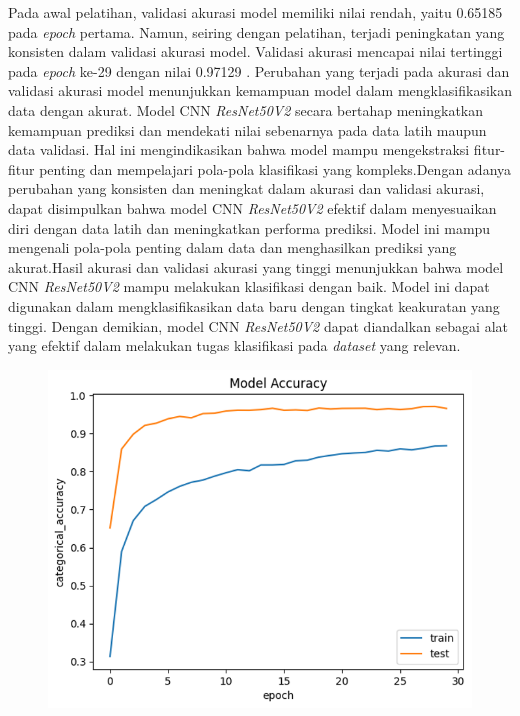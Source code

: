 Pada awal pelatihan, validasi akurasi model memiliki nilai rendah, yaitu 0.65185 pada \textit{epoch} pertama. Namun, seiring dengan pelatihan, terjadi peningkatan yang konsisten dalam validasi akurasi model. Validasi akurasi mencapai nilai tertinggi pada \textit{epoch} ke-29 dengan nilai 0.97129 . Perubahan yang terjadi pada akurasi dan validasi akurasi model menunjukkan kemampuan model dalam mengklasifikasikan data dengan akurat. Model CNN \textit{ResNet50V2} secara bertahap meningkatkan kemampuan prediksi dan mendekati nilai sebenarnya pada data latih maupun data validasi. Hal ini mengindikasikan bahwa model mampu mengekstraksi fitur-fitur penting dan mempelajari pola-pola klasifikasi yang kompleks.Dengan adanya perubahan yang konsisten dan meningkat dalam akurasi dan validasi akurasi, dapat disimpulkan bahwa model CNN \textit{ResNet50V2} efektif dalam menyesuaikan diri dengan data latih dan meningkatkan performa prediksi. Model ini mampu mengenali pola-pola penting dalam data dan menghasilkan prediksi yang akurat.Hasil akurasi dan validasi akurasi yang tinggi menunjukkan bahwa model CNN \textit{ResNet50V2} mampu melakukan klasifikasi dengan baik. Model ini dapat digunakan dalam mengklasifikasikan data baru dengan tingkat keakuratan yang tinggi. Dengan demikian, model CNN \textit{ResNet50V2} dapat diandalkan sebagai alat yang efektif dalam melakukan tugas klasifikasi pada \textit{dataset} yang relevan.

\begin{figure}[!hbt]
	\centering
	\includegraphics[width=0.7\linewidth]{gambar/bener/Accuracy_ModelResNet50V2.png}
	\label{fig:AkurasiCNNResNet50V2}
\end{figure}

